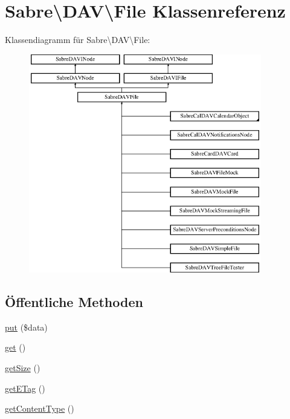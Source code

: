 \hypertarget{class_sabre_1_1_d_a_v_1_1_file}{}\section{Sabre\textbackslash{}D\+AV\textbackslash{}File Klassenreferenz}
\label{class_sabre_1_1_d_a_v_1_1_file}
Klassendiagramm für Sabre\textbackslash{}D\+AV\textbackslash{}File\+:\begin{figure}[H]
\begin{center}
\leavevmode
\includegraphics[height=9.531915cm]{class_sabre_1_1_d_a_v_1_1_file}
\end{center}
\end{figure}
\subsection*{Öffentliche Methoden}
\begin{DoxyCompactItemize}
\item 
\mbox{\hyperlink{class_sabre_1_1_d_a_v_1_1_file_a09e6952358a011032662e1371c5aa514}{put}} (\$data)
\item 
\mbox{\hyperlink{class_sabre_1_1_d_a_v_1_1_file_a0879cd6cff2723f41eb31dae59bc63d0}{get}} ()
\item 
\mbox{\hyperlink{class_sabre_1_1_d_a_v_1_1_file_ac50c6e65d39734d7858e95f080a46f4b}{get\+Size}} ()
\item 
\mbox{\hyperlink{class_sabre_1_1_d_a_v_1_1_file_a2f7e2ec46cb8def9cda8dea55faf7d9e}{get\+E\+Tag}} ()
\item 
\mbox{\hyperlink{class_sabre_1_1_d_a_v_1_1_file_af691c1f6e2de8640042b2a75181c4af5}{get\+Content\+Type}} ()
\end{DoxyCompactItemize}


